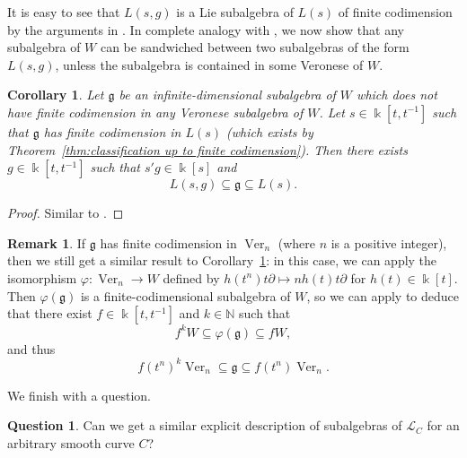 \documentclass[12pt]{amsart}
\theoremstyle{plain}
\newtheorem{corollary}[theorem]{Corollary}
\theoremstyle{definition}
\newtheorem{question}[theorem]{Question}
\newtheorem{remark}[theorem]{Remark}
\numberwithin{equation}{section}
\def\g{\mathfrak{g}}
\def\L{\mathcal{L}}
\def\NN{\mathbb{N}}
\def\kk{\Bbbk}
\DeclareMathOperator{\Ver}{Ver}
\def\del{\partial}
\begin{document}
It is easy to see that $L(s,g)$ is a Lie subalgebra of $L(s)$ of finite codimension by the arguments in \cite[Lemma 4.12 and Proposition 4.13]{Buzaglo}. In complete analogy with \cite[Theorem 2.8]{BellBuzaglo}, we now show that any subalgebra of $W$ can be sandwiched between two subalgebras of the form $L(s,g)$, unless the subalgebra is contained in some Veronese of $W$.

\begin{corollary}\label{cor:sandwich}
    Let $\g$ be an infinite-dimensional subalgebra of $W$ which does not have finite codimension in any Veronese subalgebra of $W$. Let $s \in \kk[t,t^{-1}]$ such that $\g$ has finite codimension in $L(s)$ (which exists by Theorem~\ref{thm:classification up to finite codimension}). Then there exists $g \in \kk[t,t^{-1}]$ such that $s'g \in \kk[s]$ and
    $$L(s,g) \subseteq \g \subseteq L(s).$$
\end{corollary}
\begin{proof}
    Similar to \cite[Lemma 1.9]{BellBuzaglo}.
\end{proof}

\begin{remark}
    If $\g$ has finite codimension in $\Ver_n$ (where $n$ is a positive integer), then we still get a similar result to Corollary~\ref{cor:sandwich}: in this case, we can apply the isomorphism $\varphi \colon \Ver_n \to W$ defined by $h(t^n) t\del \mapsto n h(t) t\del$ for $h(t) \in \kk[t]$. Then $\varphi(\g)$ is a finite-codimensional subalgebra of $W$, so we can apply \cite[Proposition 3.2.7]{PetukhovSierra} to deduce that there exist $f \in \kk[t,t^{-1}]$ and $k \in \NN$ such that
    $$f^k W \subseteq \varphi(\g) \subseteq f W,$$
    and thus
    $$f(t^n)^k \Ver_n \subseteq \g \subseteq f(t^n) \Ver_n.$$
\end{remark}

We finish with a question.

\begin{question}
    Can we get a similar explicit description of subalgebras of $\L_C$ for an arbitrary smooth curve $C$?
\end{question}
\end{document}
